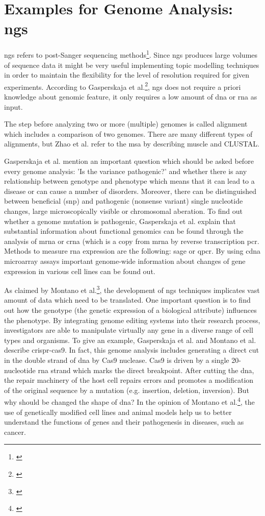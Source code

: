 \section{Examples for Genome Analysis: \gls{ngs}}\label{genome_analysis}
\gls{ngs} refers to post-Sanger sequencing methods\footnote{\autocite{zhao_2016}}. Since \gls{ngs} produces large volumes of sequence data it might be very useful implementing topic modelling techniques in order to maintain the flexibility for the level of resolution required for given experiments.  
According to Gasperskaja et al.\footnote{\autocite{gasperskaja_2017}}, \gls{ngs} does not require a priori knowledge about genomic feature, it only requires a low amount of \gls{dna} or \gls{rna} as input.

The step before analyzing two or more (multiple) genomes is called alignment which includes a comparison of two genomes. There are many different types of alignments, but Zhao et al. refer to the \gls{msa} by describing \gls{muscle} and CLUSTAL.

Gasperskaja et al. mention an important question which should be asked before every genome analysis: 'Is the variance pathogenic?' and whether there is any relationship between genotype and phenotype which means that it can lead to a disease or can cause a number of disorders. 
Moreover, there can be distinguished between beneficial (\gls{snp}) and pathogenic (nonsense variant) single nucleotide changes, large microscopically visible or chromosomal aberation. 
To find out whether a genome mutation is pathogenic, Gasperskaja et al. explain that substantial information about functional genomics can be found through the analysis of \gls{mrna} or \gls{crna} (which is a copy from \gls{mrna} by reverse transcription \gls{pcr}.
Methods to measure \gls{rna} expression are the following: \gls{sage} or \gls{qpcr}.
By using \gls{cdna} microarray assays important genome-wide information about changes of gene expression in various cell lines can be found out.

As claimed by Montano et al.\footnote{\autocite{montano_2018}}, the development of \gls{ngs} techniques implicates vast amount of data which need to be translated. One important question is to find out how the genotype (the genetic expression of a biological attribute) influences the phenotype. By integrating genome editing systems into their research process, investigators are able to manipulate virtually any gene in a diverse range of cell types and organisms.
To give an example, Gasperskaja et al. and Montano et al. describe \gls{crispr-cas9}. In fact, this genome analysis includes generating a direct cut in the double strand of \gls{dna} by Cas9 nuclease. Cas9 is driven by a single 20-nucleotide \gls{rna} strand which marks the direct breakpoint. After cutting the \gls{dna}, the repair machinery of the host cell repairs errors and promotes a modification of the original sequence by a mutation (e.g. insertion, deletion, inversion).
But why should be changed the shape of \gls{dna}? In the opinion of Montano et al.\footnote{\autocite{montano_2018}}, the use of genetically modified cell lines and animal models help us to better understand the functions of genes and their pathogenesis in diseases, such as cancer.
   
